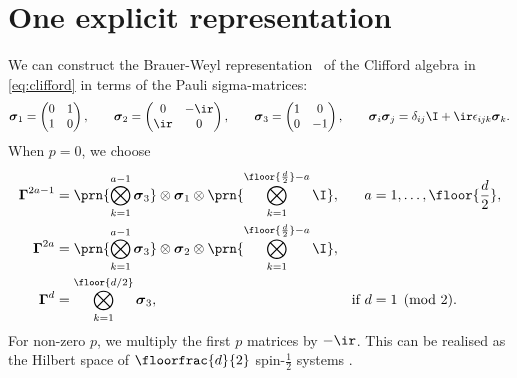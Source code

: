 \documentclass[11pt]{article}
\newcommand{\Gammab}{\boldsymbol{\Gamma}}
\newcommand{\sigmab}{\boldsymbol{\sigma}}
\begin{document}

\section{One explicit representation}\label{sec:explicit}

We can construct the Brauer-Weyl representation~\cite{brauer1935spinors} of the Clifford algebra in \cref{eq:clifford} in terms of the Pauli sigma-matrices:
%
\begin{equation}\label{eq:paulisigma}
  \sigmab_1 = \begin{pmatrix}
                0 & 1 \\
                1 & 0 \\
              \end{pmatrix}
  , \qquad
  \sigmab_2 = \begin{pmatrix}
                0   & -\ir \\
                \ir & 0    \\
              \end{pmatrix}
  , \qquad
  \sigmab_3 = \begin{pmatrix}
                1 & 0  \\
                0 & -1 \\
              \end{pmatrix}
  , \qquad
  \sigmab_i \sigmab_j = \delta_{ij} \I + \ir \epsilon_{ijk} \sigmab_k.
\end{equation}
%
When \(p=0\), we choose
%
\begin{equation}\label{eq:explicit}
\begin{aligned}
  \Gammab^{2a-1} &= \prn{\bigotimes_{k=1}^{a-1} \sigmab_3}
                    \otimes \sigmab_1 \otimes
                    \prn{\bigotimes_{k=1}^{\floor{\frac{d}{2}}-a} \I}, &
    a &= 1, \ldots, \floor{\frac{d}{2}}, \\
  \Gammab^{2a} &= \prn{\bigotimes_{k=1}^{a-1} \sigmab_3}
                  \otimes \sigmab_2 \otimes
                  \prn{\bigotimes_{k=1}^{\floor{\frac{d}{2}}-a} \I}, \\
  \Gammab^d &= \bigotimes_{k=1}^{\floor{d/2}} \sigmab_3, &
    \text{if }
    d &= 1 \pmod 2.
\end{aligned}
\end{equation}
%
For non-zero \(p\), we multiply the first \(p\) matrices by \(-\ir\).
This can be realised as the Hilbert space of \(\floorfrac{d}{2}\) spin-\(\frac{1}{2}\) systems
\cite{Strathdee:1987jr,strathdee1986extended}.
\end{document}

